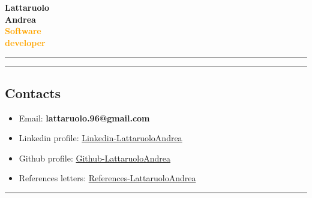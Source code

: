 \documentclass[a4paper,10pt]{article}
\begin{document}
\thispagestyle{empty} %

\noindent
\begin{minipage}[t]{0.25\textwidth}
    \vspace{0.3cm}
    { \LARGE  \textbf{Lattaruolo \\[0.1cm] Andrea \\[0.1cm] \textcolor{orange}{\newline Software \\[0.1cm] developer}}} \\[0.5cm]
    \rule{0.6cm}{0.3mm}
\end{minipage}
\hfill
\begin{minipage}[t]{0.75\textwidth}
    \rule{\linewidth}{0.5mm} %
    \subsection*{Contacts}
    \begin{itemize}[leftmargin=1cm]
        \item Email: \textbf{lattaruolo.96@gmail.com}
        \item Linkedin profile: \href{https://github.com/LattaruoloAndrea}{Linkedin-LattaruoloAndrea} 
        \item Github profile: \href{https://github.com/LattaruoloAndrea}{Github-LattaruoloAndrea} 
        \item References letters: \href{https://github.com/LattaruoloAndrea/CV/tree/main/references}{References-LattaruoloAndrea} 
    \end{itemize}
    \vspace{0.8cm}
    \rule{\linewidth}{0.5mm}
\end{minipage}
\end{document}
